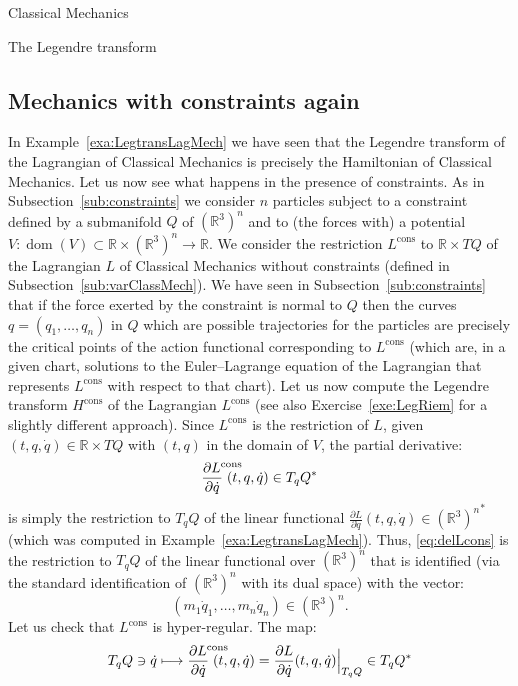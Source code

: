 \documentclass[oneside,a4paper,11pt]{amsbook}
\newcommand{\R}{\mathds R}
\DeclareMathOperator{\Dom}{dom}
\theoremstyle{remark}\newtheorem{exercise}{Exercise}[chapter]
\theoremstyle{plain}\newtheorem{teo}{Theorem}[section]
\theoremstyle{plain}\newtheorem{lem}[teo]{Lemma}
\theoremstyle{plain}\newtheorem{prop}[teo]{Proposition}
\theoremstyle{plain}\newtheorem{cor}[teo]{Corollary}
\theoremstyle{definition}\newtheorem{defin}[teo]{Definition}
\theoremstyle{remark}\newtheorem{rem}[teo]{Remark}
\theoremstyle{definition}\newtheorem{notation}[teo]{Notation}
\theoremstyle{definition}\newtheorem{convention}[teo]{Convention}
\theoremstyle{definition}\newtheorem{example}[teo]{Example}
\numberwithin{section}{chapter}
\numberwithin{equation}{section}
\begin{document}
\begin{chapter}{Classical Mechanics}
\begin{section}{The Legendre transform}
\subsection{Mechanics with constraints again}\label{sub:constraintsagain}
In Example~\ref{exa:LegtransLagMech} we have seen that
the Legendre transform of the Lagrangian of Classical Mechanics is precisely the Hamiltonian of Classical Mechanics.
Let us now see what happens in the presence of constraints. As in Subsection~\ref{sub:constraints} we consider
$n$ particles subject to a constraint defined by a submanifold $Q$ of $(\R^3)^n$ and to (the
forces with) a potential $V:\Dom(V)\subset\R\times(\R^3)^n\to\R$. We consider the restriction $L^{\mathrm{cons}}$
to $\R\times TQ$ of the Lagrangian $L$ of Classical Mechanics without constraints (defined in Subsection~\ref{sub:varClassMech}).
We have seen in Subsection~\ref{sub:constraints} that if the force exerted by the constraint is normal to $Q$ then
the curves $q=(q_1,\ldots,q_n)$ in $Q$ which are possible trajectories for the particles are precisely the critical
points of the action functional corresponding to $L^{\mathrm{cons}}$ (which are, in a given chart, solutions
to the Euler--Lagrange equation of the Lagrangian that represents $L^{\mathrm{cons}}$ with respect to that chart).
Let us now compute the Legendre transform $H^{\mathrm{cons}}$ of the Lagrangian $L^{\mathrm{cons}}$ (see also Exercise~\ref{exe:LegRiem}
for a slightly different approach).
Since $L^{\mathrm{cons}}$ is the restriction of $L$, given $(t,q,\dot q)\in\R\times TQ$ with $(t,q)$ in the domain
of $V$, the partial derivative:
\begin{equation}\label{eq:delLcons}
\frac{\partial L^{\hbox to 0pt{$\scriptstyle\mathrm{cons}$\hskip 0pt minus 1fil}}}{\partial\dot q}\;
(t,q,\dot q)\in T_qQ^*
\end{equation}
is simply the restriction to $T_qQ$ of the linear functional
$\frac{\partial L}{\partial\dot q}(t,q,\dot q)\in{(\R^3)^n}^*$ (which was computed in Example~\ref{exa:LegtransLagMech}).
Thus, \eqref{eq:delLcons} is the restriction to $T_qQ$ of the linear functional over $(\R^3)^n$ that is identified
(via the standard identification of $(\R^3)^n$ with its dual space) with the vector:
\[(m_1\dot q_1,\ldots,m_n\dot q_n)\in(\R^3)^n.\]
Let us check that $L^{\mathrm{cons}}$ is hyper-regular. The map:
\begin{equation}\label{eq:delLcons2}
T_qQ\ni\dot q\longmapsto\frac{\partial L^{\hbox to 0pt{$\scriptstyle\mathrm{cons}$\hskip 0pt minus 1fil}}}{\partial\dot q}\;
(t,q,\dot q)=\frac{\partial L}{\partial\dot q}(t,q,\dot q)\Big\vert_{T_qQ}\in T_qQ^*

\end{equation}
\end{section}
\end{chapter}
\end{document}
